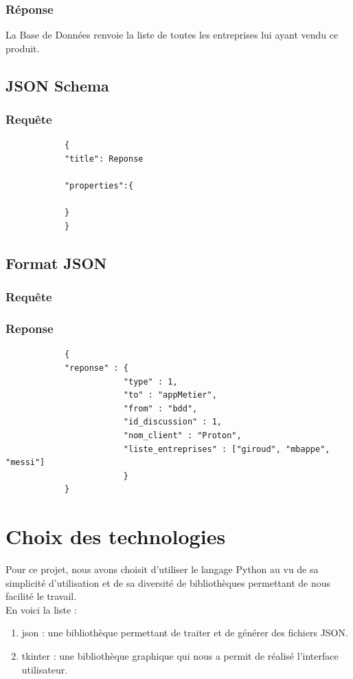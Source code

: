\documentclass[a4paper, 11pt]{article}
\begin{document}
        \subsubsection{Réponse}
        La Base de Données renvoie la liste de toutes les entreprises lui ayant vendu ce produit.
    \subsection{JSON Schema}
        \subsubsection{Requête}
        \begin{verbatim}
            {
            "title": Reponse
            
            "properties":{
                
            }
            }
        \end{verbatim}
    
    
    \subsection{Format JSON}
        \subsubsection{Requête}
            
        \subsubsection{Reponse}
        \begin{verbatim}
            {
            "reponse" : {
                        "type" : 1,
                        "to" : "appMetier",
                        "from" : "bdd",
                        "id_discussion" : 1,
                        "nom_client" : "Proton",
                        "liste_entreprises" : ["giroud", "mbappe", "messi"]
                        }
            }
        \end{verbatim}

\section{Choix des technologies}
Pour ce projet, nous avons choisit d'utiliser le langage Python au vu de sa simplicité d'utilisation et de sa diversité de bibliothèques permettant de nous facilité le travail.\\
En voici la liste :
\begin{enumerate}
    \item json : une bibliothèque permettant de traiter et de générer des fichiers JSON.
    \item tkinter : une bibliothèque graphique qui nous a permit de réalisé l'interface utilisateur.
\end{enumerate}
\end{document}
